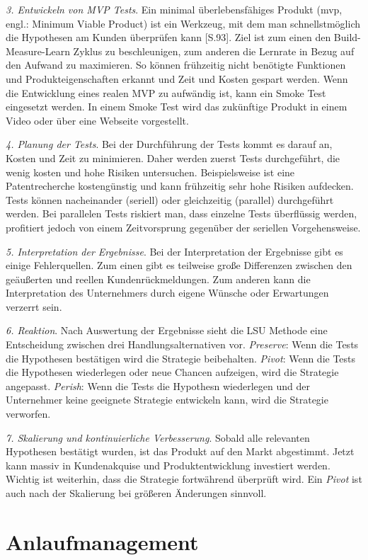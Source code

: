 \textit{3. Entwickeln von MVP Tests}. Ein minimal überlebensfähiges Produkt (\gls{mvp}, engl.: Minimum Viable Product) ist ein Werkzeug, mit dem man schnellstmöglich die Hypothesen am Kunden überprüfen kann \cite{Ries2013}[S.93]. Ziel ist zum einen den Build-Measure-Learn Zyklus zu beschleunigen, zum anderen die Lernrate in Bezug auf den Aufwand zu maximieren. So können frühzeitig nicht benötigte Funktionen und Produkteigenschaften erkannt und Zeit und Kosten gespart werden. Wenn die Entwicklung eines realen MVP zu aufwändig ist, kann ein Smoke Test eingesetzt werden. In einem Smoke Test wird das zukünftige Produkt in einem Video oder über eine Webseite vorgestellt.

\textit{4. Planung der Tests}. Bei der Durchführung der Tests kommt es darauf an, Kosten und Zeit zu minimieren. Daher werden zuerst Tests durchgeführt, die wenig kosten und hohe Risiken untersuchen. Beispielsweise ist eine Patentrecherche kostengünstig und kann frühzeitig sehr hohe Risiken aufdecken. Tests können nacheinander (seriell) oder gleichzeitig (parallel) durchgeführt werden. Bei parallelen Tests riskiert man, dass einzelne Tests überflüssig werden, profitiert jedoch von einem Zeitvorsprung gegenüber der seriellen Vorgehensweise. 

\textit{5. Interpretation der Ergebnisse}. Bei der Interpretation der Ergebnisse gibt es einige Fehlerquellen. Zum einen gibt es teilweise große Differenzen zwischen den geäußerten und reellen Kundenrückmeldungen. Zum anderen kann die Interpretation des Unternehmers durch eigene Wünsche oder Erwartungen verzerrt sein.

\textit{6. Reaktion}. Nach Auswertung der Ergebnisse sieht die LSU Methode eine Entscheidung zwischen drei Handlungsalternativen vor. \textit{Preserve}: Wenn die Tests die Hypothesen bestätigen wird die Strategie beibehalten. \textit{Pivot}: Wenn die Tests die Hypothesen wiederlegen oder neue Chancen aufzeigen, wird die Strategie angepasst. \textit{Perish}: Wenn die Tests die Hypothesn wiederlegen und der Unternehmer keine geeignete Strategie entwickeln kann, wird die Strategie verworfen. 

\textit{7. Skalierung und kontinuierliche Verbesserung}. Sobald alle relevanten Hypothesen bestätigt wurden, ist das Produkt auf den Markt abgestimmt. Jetzt kann massiv in Kundenakquise und Produktentwicklung investiert werden. Wichtig ist weiterhin, dass die Strategie fortwährend überprüft wird. Ein \textit{Pivot} ist auch nach der Skalierung bei größeren Änderungen sinnvoll. 


\section{Anlaufmanagement}


